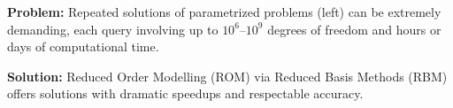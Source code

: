 \documentclass[a0,portrait]{a0poster}
\begin{document}
\begin{multicols}{2}
\begin{figure}
\end{figure}

\noindent \textbf{Problem:} Repeated solutions of parametrized
problems (left) can be extremely demanding, each query involving up to
$10^6$--$10^9$ degrees of freedom and hours or days of computational
time.

\noindent \textbf{Solution:} Reduced Order Modelling (ROM) via Reduced
Basis Methods (RBM) offers solutions with dramatic speedups and
respectable accuracy.


\end{multicols}
\end{document}
